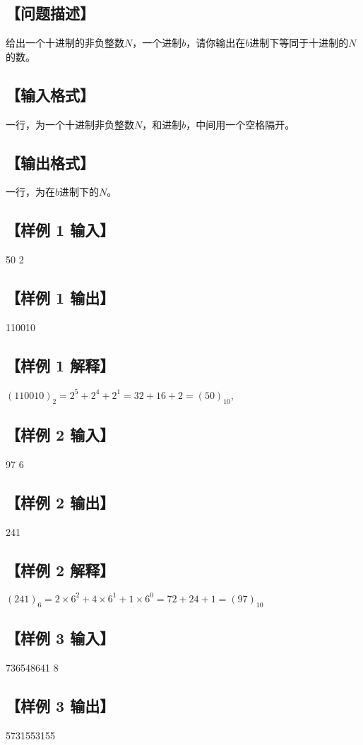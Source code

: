 \documentclass[12pt]{article}
\begin{document}
	\subsection*{\normalsize 【问题描述】}
	给出一个十进制的非负整数$N$，一个进制$b$，请你输出在$b$进制下等同于十进制的$N$的数。
	
	\subsection*{\normalsize 【输入格式】}
	一行，为一个十进制非负整数$N$，和进制$b$，中间用一个空格隔开。
	
	\subsection*{\normalsize 【输出格式】}
	一行，为在$b$进制下的$N$。
	
	\subsection*{\normalsize 【样例 1 输入】}
	50 2
	\subsection*{\normalsize 【样例 1 输出】}
	110010
	\subsection*{\normalsize 【样例 1 解释】}
	$(110010)_2 = 2^5 + 2^4 + 2^1 = 32 + 16 + 2 = (50)_{10}$, 
	
	\subsection*{\normalsize 【样例 2 输入】}
	97 6
	\subsection*{\normalsize 【样例 2 输出】}
	241
	\subsection*{\normalsize 【样例 2 解释】}
	$(241)_6 = 2 \times 6^2 + 4 \times 6^1 + 1 \times 6^0 = 72 + 24 + 1 = (97)_{10}$

	\subsection*{\normalsize 【样例 3 输入】}
	736548641 8
	\subsection*{\normalsize 【样例 3 输出】}
	5731553155
	
\end{document}
